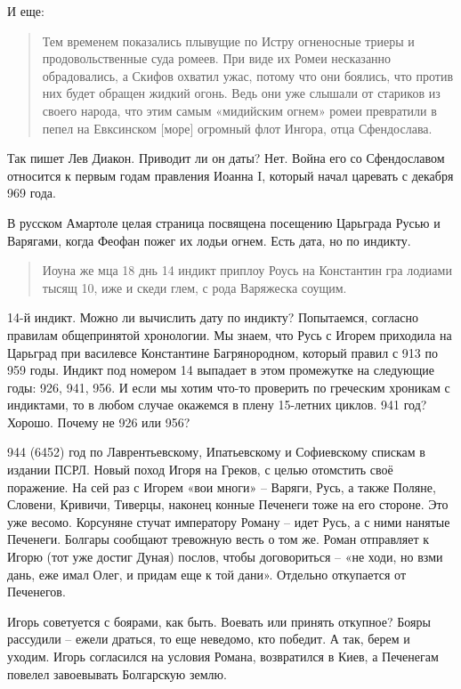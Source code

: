 И еще\cite[стр. 75]{diakon01}:

\begin{quotation}
Тем временем показались плывущие по Истру огненосные триеры и продовольственные суда ромеев. При виде их Ромеи несказанно обрадовались, а Скифов охватил ужас, потому что они боялись, что против них будет обращен жидкий огонь. Ведь они уже слышали от стариков из своего народа, что этим самым «мидийским огнем» ромеи превратили в пепел на Евксинском [море] огромный флот Ингора, отца Сфендослава.
\end{quotation}

Так пишет Лев Диакон. Приводит ли он даты? Нет. Война его со Сфендославом относится к первым годам правления Иоанна I, который начал царевать с декабря 969 года.

В русском Амартоле целая страница посвящена посещению Царьграда Русью и Варягами, когда Феофан пожег их лодьи огнем. Есть дата, но по индикту.

\begin{quotation}
Иоуна же мца 18 днь 14 индикт приплоу Роусь на Константин гра лодиами тысящ 10, иже и скеди глем, с рода Варяжеска соущим.
\end{quotation}

14-й индикт. Можно ли вычислить дату по индикту? Попытаемся, согласно правилам общепринятой хронологии. Мы знаем, что Русь с Игорем приходила на Царьград при василевсе Константине Багрянородном, который правил с 913 по 959 годы. Индикт под номером 14 выпадает в этом промежутке на следующие годы: 926, 941, 956. И если мы хотим что-то проверить по греческим хроникам с индиктами, то в любом случае окажемся в плену 15-летних циклов. 941 год? Хорошо. Почему не 926 или 956?

944 (6452) год по Лаврентьевскому, Ипатьевскому и Софиевскому спискам в издании ПСРЛ. Новый поход Игоря на Греков, с целью отомстить своё поражение. На сей раз с Игорем «вои многи» – Варяги, Русь, а также Поляне, Словени, Кривичи, Тиверцы, наконец конные Печенеги тоже на его стороне. Это уже весомо. Корсуняне стучат императору Роману – идет Русь, а с ними нанятые Печенеги. Болгары сообщают тревожную весть о том же. Роман отправляет к Игорю (тот уже достиг Дуная) послов, чтобы договориться – «не ходи, но взми дань, еже имал Олег, и придам еще к той дани». Отдельно откупается от Печенегов.

Игорь советуется с боярами, как быть. Воевать или принять откупное? Бояры рассудили – ежели драться, то еще неведомо, кто победит. А так, берем и уходим. Игорь согласился на условия Романа, возвратился в Киев, а Печенегам повелел завоевывать Болгарскую землю.

